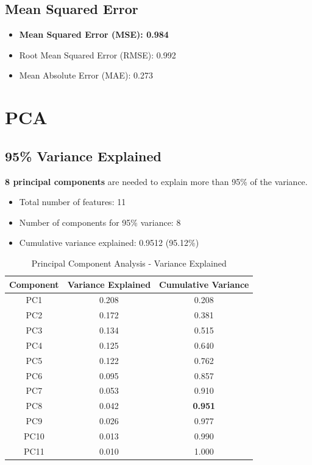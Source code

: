 \documentclass[12pt]{article}
\begin{document}
\subsection{Mean Squared Error}

\begin{itemize}
    \item \textbf{Mean Squared Error (MSE): 0.984}
    \item Root Mean Squared Error (RMSE): 0.992
    \item Mean Absolute Error (MAE): 0.273
\end{itemize}

\section{PCA}

\subsection{95\% Variance Explained}

\textbf{8 principal components} are needed to explain more than 95\% of the variance.

\begin{itemize}
    \item Total number of features: 11
    \item Number of components for 95\% variance: 8
    \item Cumulative variance explained: 0.9512 (95.12\%)
\end{itemize}

\begin{table}[H]
\centering
\caption{Principal Component Analysis - Variance Explained}
\begin{tabular}{ccc}
\toprule
\textbf{Component} & \textbf{Variance Explained} & \textbf{Cumulative Variance} \\
\midrule
PC1 & 0.208 & 0.208 \\
PC2 & 0.172 & 0.381 \\
PC3 & 0.134 & 0.515 \\
PC4 & 0.125 & 0.640 \\
PC5 & 0.122 & 0.762 \\
PC6 & 0.095 & 0.857 \\
PC7 & 0.053 & 0.910 \\
PC8 & 0.042 & \textbf{0.951} \\
PC9 & 0.026 & 0.977 \\
PC10 & 0.013 & 0.990 \\
PC11 & 0.010 & 1.000 \\
\bottomrule
\end{tabular}
\end{table}
\end{document}
